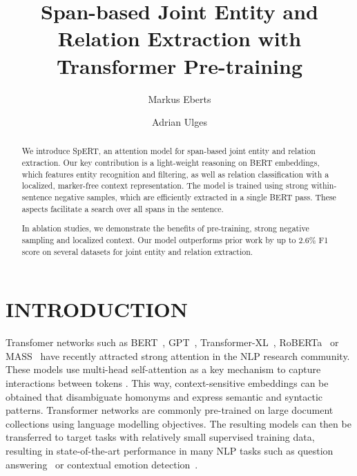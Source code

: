 \documentclass{ecai}
\begin{document}
\title{Span-based Joint Entity and Relation Extraction with Transformer Pre-training}
\author{Markus Eberts \and Adrian Ulges}
\maketitle
{}


\begin{abstract}
We introduce SpERT, an attention model for span-based joint entity and relation extraction.  Our key contribution is a light-weight reasoning on BERT embeddings, which features entity recognition and filtering, as well as relation classification with a localized, marker-free context representation. The model is trained using strong within-sentence negative samples, which are efficiently extracted in a single BERT pass. These aspects facilitate a search over all spans in the sentence. 

In ablation studies, we demonstrate the benefits of pre-training, strong negative sampling and localized context. Our model outperforms prior work by up to 2.6\% F1 score on several datasets for joint entity and relation extraction. 
\end{abstract}

\section{INTRODUCTION}
\setcounter{footnote}{2}

Transfomer networks such as BERT~\cite{devlin:2018:bert}, GPT~\cite{radford:2018:lm_transformer}, Transformer-XL~\cite{dai:2019:transformer_xl}, RoBERTa~\cite{liu:2019:roberta} or MASS~\cite{song:2019:mass} have recently attracted strong attention in the NLP research community. These models use multi-head self-attention as a key mechanism to capture interactions between tokens \cite{bahdanau:2014:machine_translation_joint,vaswani:2017:transformer}. This way, context-sensitive embeddings can be obtained that disambiguate homonyms and express semantic and syntactic patterns. 
Transformer networks are commonly pre-trained on large document collections using language modelling objectives. The resulting models can then be transferred to target tasks with relatively small supervised training data, resulting in state-of-the-art performance in many NLP tasks such as question answering~\cite{yang:2019:qa} or contextual emotion detection~\cite{chatterjee:2019:semeval_emotion}.
\end{document}
